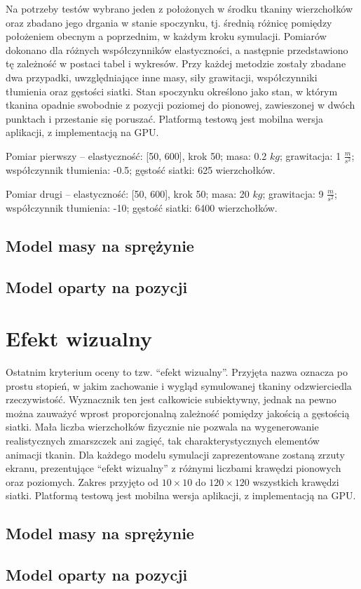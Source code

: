 		Na potrzeby testów wybrano jeden z położonych w środku tkaniny wierzchołków oraz zbadano jego drgania w stanie spoczynku, tj. średnią różnicę pomiędzy położeniem obecnym a poprzednim, w każdym kroku symulacji. Pomiarów dokonano dla różnych współczynników elastyczności, a następnie przedstawiono tę zależność w postaci tabel i wykresów. Przy każdej metodzie zostały zbadane dwa przypadki, uwzględniające inne masy, siły grawitacji, współczynniki tłumienia oraz gęstości siatki. Stan spoczynku określono jako stan, w którym tkanina opadnie swobodnie z pozycji poziomej do pionowej, zawieszonej w dwóch punktach i przestanie się poruszać. Platformą testową jest mobilna wersja aplikacji, z implementacją na GPU.
		
		Pomiar pierwszy -- elastyczność: [50, 600], krok 50; masa: 0.2 \(kg\); grawitacja: 1 \(\frac{m}{s^2}\); współczynnik tłumienia: -0.5; gęstość siatki: 625 wierzchołków.
		
		Pomiar drugi -- elastyczność: [50, 600], krok 50; masa: 20 \(kg\); grawitacja: 9 \(\frac{m}{s^2}\); współczynnik tłumienia: -10; gęstość siatki: 6400 wierzchołków.
	
		\subsection{Model masy na sprężynie}
		\label{t:wyniki:stabilnosc:ms}
		
		
		\subsection{Model oparty na pozycji}
		\label{t:wyniki:stabilnosc:pb}
		
		
	\section{Efekt wizualny}
	\label{t:wyniki:efektwiz}
		
		Ostatnim kryterium oceny to tzw. ``efekt wizualny''. Przyjęta nazwa oznacza po prostu stopień, w jakim zachowanie i wygląd symulowanej tkaniny odzwierciedla rzeczywistość. Wyznacznik ten jest całkowicie subiektywny, jednak na pewno można zauważyć wprost proporcjonalną zależność pomiędzy jakością a gęstością siatki. Mała liczba wierzchołków fizycznie nie pozwala na wygenerowanie realistycznych zmarszczek ani zagięć, tak charakterystycznych elementów animacji tkanin. Dla każdego modelu symulacji zaprezentowane zostaną zrzuty ekranu, prezentujące ``efekt wizualny'' z różnymi liczbami krawędzi pionowych oraz poziomych. Zakres przyjęto od \(10 \times 10\) do \(120 \times 120\) wszystkich krawędzi siatki. Platformą testową jest mobilna wersja aplikacji, z implementacją na GPU.
			
		\subsection{Model masy na sprężynie}
		\label{t:wyniki:efektwiz:ms}
			
			
		\subsection{Model oparty na pozycji}
		\label{t:wyniki:efektwiz:pb}
